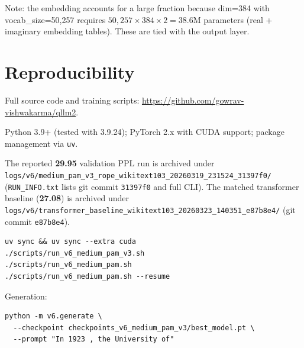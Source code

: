 \documentclass[11pt]{article}
\begin{document}
Note: the embedding accounts for a large fraction because dim=384 with vocab\_size=50,257 requires $50{,}257 \times 384 \times 2 = 38.6$M parameters (real + imaginary embedding tables). These are tied with the output layer.

\section{Reproducibility}
Full source code and training scripts: \url{https://github.com/gowrav-vishwakarma/qllm2}.

Python 3.9+ (tested with 3.9.24); PyTorch 2.x with CUDA support; package management via \texttt{uv}.

The reported \textbf{29.95} validation PPL run is archived under \texttt{logs/v6/medium\_pam\_v3\_rope\_wikitext103\_20260319\_231524\_31397f0/} (\texttt{RUN\_INFO.txt} lists git commit \texttt{31397f0} and full CLI). The matched transformer baseline (\textbf{27.08}) is archived under \texttt{logs/v6/transformer\_baseline\_wikitext103\_20260323\_140351\_e87b8e4/} (git commit \texttt{e87b8e4}).

\begin{verbatim}
uv sync && uv sync --extra cuda
./scripts/run_v6_medium_pam_v3.sh
./scripts/run_v6_medium_pam.sh
./scripts/run_v6_medium_pam.sh --resume
\end{verbatim}

Generation:
\begin{verbatim}
python -m v6.generate \
  --checkpoint checkpoints_v6_medium_pam_v3/best_model.pt \
  --prompt "In 1923 , the University of"
\end{verbatim}



\end{document}
